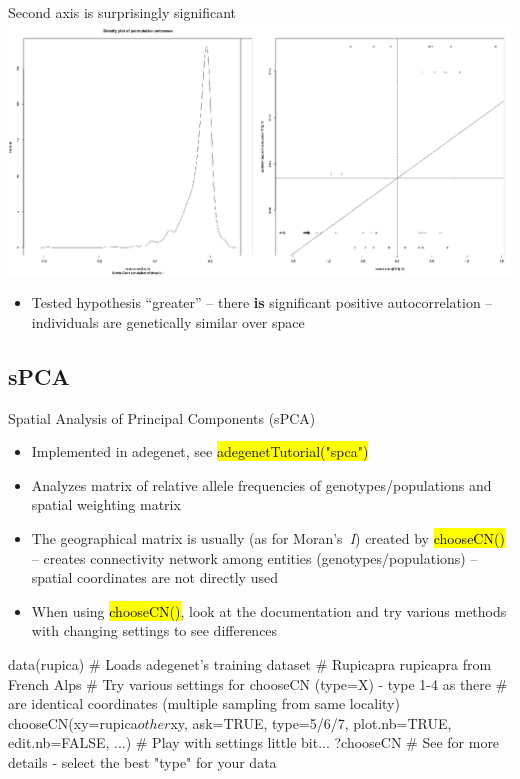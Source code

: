 \documentclass[compress, ucs, xelatex, 11pt, xcolor=svgnames,
  hyperref={
    bookmarks=true,
    unicode=true,
    colorlinks=true,
    pdftitle={Molecular data in R},
    plainpages=false,
    pdfauthor={Vojtech Zeisek},
    pdfsubject={Course about phylogeny and evolution in R},
    pdfcreator={XeLaTeX},
    pdfkeywords={R, evolution, phylogeny, molecular data},
    linkcolor=Tomato,
    anchorcolor=SaddleBrown,
    citecolor=Goldenrod,
    filecolor=DarkMagenta,
    menucolor=Sienna,
    urlcolor=DarkTurquoise,
    pdftex},
  url={hyphens, lowtilde} %
  ]{beamer}
\renewcommand{\texttt}[1]{\hl{\ttfamily #1}}
\begin{document}
\begin{frame}{Second axis is surprisingly significant}
  \includegraphics[width=\textwidth]{moran2.png}
  \begin{itemize}
    \item Tested hypothesis ``greater'' -- there \textbf{is} significant positive autocorrelation -- individuals are genetically similar over space
  \end{itemize}
\end{frame}

\subsection{sPCA}

\begin{frame}[fragile]{Spatial Analysis of Principal Components (sPCA)}
  \begin{itemize}
    \item Implemented in adegenet, see \texttt{adegenetTutorial("spca")}
    \item Analyzes matrix of relative allele frequencies of genotypes/populations and spatial weighting matrix
    \item The geographical matrix is usually (as for Moran's~\textit{I}) created by \texttt{chooseCN()} -- creates connectivity network among entities (genotypes/populations) -- spatial coordinates are not directly used
    \item When using \texttt{chooseCN()}, look at the documentation and try various methods with changing settings to see differences
  \end{itemize}
  \begin{spluscode}
    data(rupica) # Loads adegenet's training dataset
                 # Rupicapra rupicapra from French Alps
    # Try various settings for chooseCN (type=X) - type 1-4 as there
    # are identical coordinates (multiple sampling from same locality)
    chooseCN(xy=rupica$other$xy, ask=TRUE, type=5/6/7, plot.nb=TRUE,
      edit.nb=FALSE, ...) # Play with settings little bit...
    ?chooseCN # See for more details - select the best "type" for your data
  \end{spluscode}
\end{frame}
\end{document}
